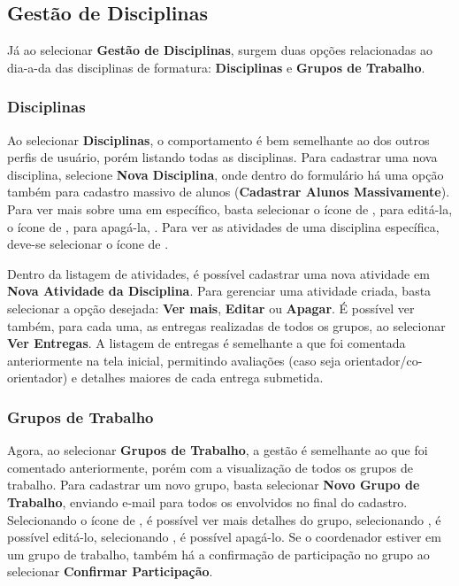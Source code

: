 \subsection{Gestão de Disciplinas}
Já ao selecionar \textbf{Gestão de Disciplinas}, surgem duas opções relacionadas ao dia-a-da das disciplinas de formatura: \textbf{Disciplinas} e \textbf{Grupos de Trabalho}.

\subsubsection{Disciplinas}
Ao selecionar \textbf{Disciplinas}, o comportamento é bem semelhante ao dos outros perfis de usuário, porém listando todas as disciplinas. Para cadastrar uma nova disciplina, selecione \textbf{Nova Disciplina}, onde dentro do formulário há uma opção também para cadastro massivo de alunos (\textbf{Cadastrar Alunos Massivamente}). Para ver mais sobre uma em específico, basta selecionar o ícone de \faEye, para editá-la, o ícone de \faEdit, para apagá-la, \faTrash. Para ver as atividades de uma disciplina específica, deve-se selecionar o ícone de \faListUl.

Dentro da listagem de atividades, é possível cadastrar uma nova atividade em \textbf{Nova Atividade da Disciplina}. Para gerenciar uma atividade criada, basta selecionar a opção desejada: \textbf{Ver mais}, \textbf{Editar} ou \textbf{Apagar}. É possível ver também, para cada uma, as entregas realizadas de todos os grupos, ao selecionar \textbf{Ver Entregas}. A listagem de entregas é semelhante a que foi comentada anteriormente na tela inicial, permitindo avaliações (caso seja orientador/co-orientador) e detalhes maiores de cada entrega submetida.

\subsubsection{Grupos de Trabalho}
Agora, ao selecionar \textbf{Grupos de Trabalho}, a gestão é semelhante ao que foi comentado anteriormente, porém com a visualização de todos os grupos de trabalho. Para cadastrar um novo grupo, basta selecionar \textbf{Novo Grupo de Trabalho}, enviando e-mail para todos os envolvidos no final do cadastro. Selecionando o ícone de \faEye, é possível ver mais detalhes do grupo, selecionando \faEdit, é possível editá-lo, selecionando \faTrash, é possível apagá-lo. Se o coordenador estiver em um grupo de trabalho, também há a confirmação de participação no grupo ao selecionar \textbf{Confirmar Participação}.

